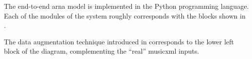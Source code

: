 
The end-to-end \gls{arna} model is implemented in the Python
programming language. Each of the modules of the system
roughly corresponds with the blocks shown in
.


The data augmentation technique introduced in
 corresponds to the
lower left block of the diagram, complementing the ``real''
\gls{musicxml} inputs.
